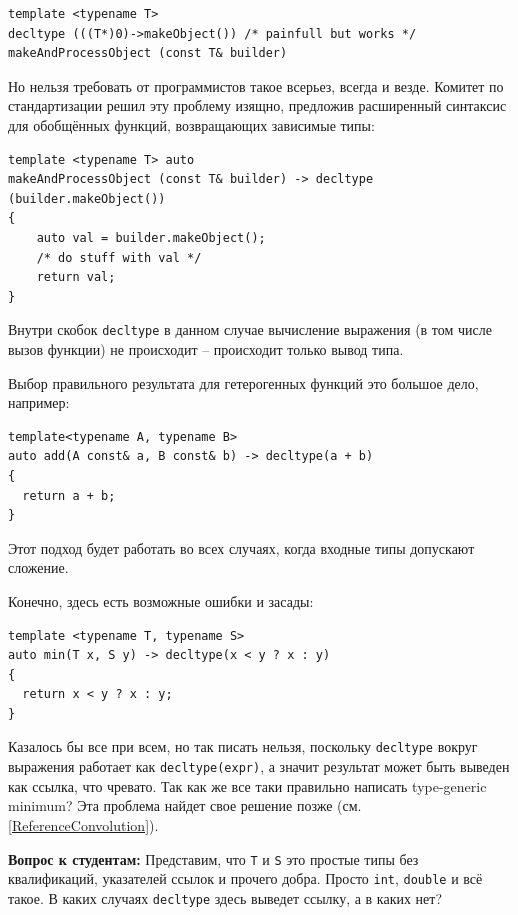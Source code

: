 \documentclass[a4paper,12pt,oneside]{article}
\begin{document}
\begin{lstlisting}
template <typename T> 
decltype (((T*)0)->makeObject()) /* painfull but works */
makeAndProcessObject (const T& builder)
\end{lstlisting}

Но нельзя требовать от программистов такое всерьез, всегда и везде. Комитет по стандартизации решил эту проблему изящно, предложив расширенный синтаксис для обобщённых функций, возвращающих зависимые типы:

\begin{lstlisting}
template <typename T> auto
makeAndProcessObject (const T& builder) -> decltype (builder.makeObject())
{
    auto val = builder.makeObject();
    /* do stuff with val */
    return val;
}
\end{lstlisting}

Внутри скобок \lstinline!decltype! в данном случае вычисление выражения (в том числе вызов функции) не происходит -- происходит только вывод типа.

Выбор правильного результата для гетерогенных функций это большое дело, например:

\begin{lstlisting}
template<typename A, typename B> 
auto add(A const& a, B const& b) -> decltype(a + b) 
{ 
  return a + b; 
}
\end{lstlisting}

Этот подход будет работать во всех случаях, когда входные типы допускают сложение.

Конечно, здесь есть возможные ошибки и засады:

\begin{lstlisting}
template <typename T, typename S>
auto min(T x, S y) -> decltype(x < y ? x : y) 
{
  return x < y ? x : y;
}
\end{lstlisting}

Казалось бы все при всем, но так писать нельзя, поскольку \lstinline!decltype! вокруг выражения работает как \lstinline!decltype(expr)!, а значит результат может быть выведен как ссылка, что чревато. Так как же все таки правильно написать type-generic minimum? Эта проблема найдет свое решение позже (см. \ref{ReferenceConvolution}).

\textbf{Вопрос к студентам:} Представим, что \lstinline!T! и \lstinline!S! это простые типы без квалификаций, указателей ссылок и прочего добра. Просто  \lstinline!int!, \lstinline!double! и всё такое. В каких случаях  \lstinline!decltype! здесь выведет ссылку, а в каких нет? 
\end{document}
